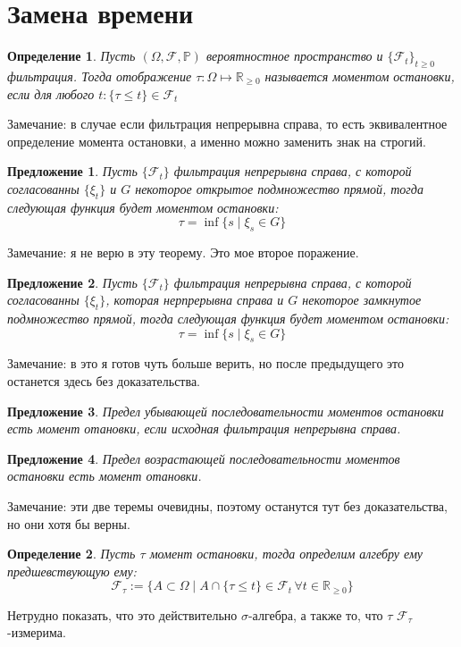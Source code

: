 \documentclass[12pt,a4paper]{article} %
\newtheorem{definition}{Определение}
\newtheorem{proposition}{Предложение}
\newcommand{\R}{\mathbb{R}}
\newcommand{\PR}{\mathbb{P}}
\newcommand{\F}{\mathcal{F}}
\begin{document}
	\section{Замена времени}
	\begin{definition}
		Пусть $(\Omega,\F,\PR)$ вероятностное пространство и $\{\F_t\}_{t\geq0}$ фильтрация. Тогда отображение $\tau:\Omega\mapsto\R_{\geq0}$ называется моментом остановки, если для любого $t:\{\tau\leq t\}\in\F_t$
	\end{definition}
	Замечание: в случае если фильтрация непрерывна справа, то есть эквивалентное определение момента остановки, а именно можно заменить знак на строгий.
	\begin{proposition}	
		Пусть $\{\F_t\}$ фильтрация непрерывна справа, с которой согласованны $\{\xi_t\}$ и $G$ некоторое открытое подмножество прямой, тогда следующая функция будет моментом остановки:
		$$\tau=\inf\{s\mid\xi_s\in G\}$$
	\end{proposition} %
	Замечание: я не верю в эту теорему. Это мое второе поражение.
	\begin{proposition}
		Пусть $\{\F_t\}$ фильтрация непрерывна справа, с которой согласованны $\{\xi_t\}$, которая нерпрерывна справа и $G$ некоторое замкнутое подмножество прямой, тогда следующая функция будет моментом остановки:
		$$\tau=\inf\{s\mid\xi_s\in G\}$$
	\end{proposition}
	Замечание: в это я готов чуть больше верить, но после предыдущего это останется здесь без доказательства.
	\begin{proposition}
		Предел убывающей последовательности моментов остановки есть момент отановки, если исходная фильтрация непрерывна справа.
	\end{proposition}	
	\begin{proposition}
		Предел возрастающей последовательности моментов остановки есть момент отановки.
	\end{proposition}
	Замечание: эти две теремы очевидны, поэтому останутся тут без доказательства, но они хотя бы верны.
	\begin{definition}
		Пусть $\tau$ момент остановки, тогда определим алгебру ему предшевствующую ему:
		$$\F_{\tau}:=\{A\subset\Omega\mid A\cap\{\tau\leq t\}\in\F_t\,\forall t\in\R_{\geq0}\}$$
	\end{definition}
	Нетрудно показать, что это действительно $\sigma$-алгебра, а также то, что $\tau$ $\F_{\tau}$-измерима.
	
\end{document}
